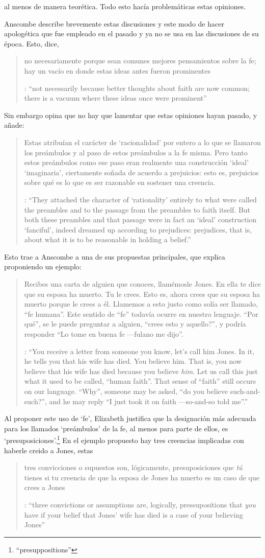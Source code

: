 al menos de manera teorética. Todo esto hacía problemáticas estas opiniones.

Anscombe describe brevemente estas discusiones y este modo de hacer apologética que fue empleado en el pasado y ya no se usa en las discusiones de su época. Esto, dice, \blockquote[{\cite[114]{anscombe1981erp:faith}}: \enquote{not necessarily because better thoughts about faith are now common; there is a vacuum where these ideas once were prominent}]{no necesariamente porque sean comunes mejores pensamientos sobre la fe; hay un vacío en donde estas ideas antes fueron prominentes}. Sin embargo opina que no hay que lamentar que estas opiniones hayan pasado, y añade: \blockquote[{\cite[114]{anscombe1981erp:faith}}: \enquote{They attached the character of `rationality' entirely to what were called the preambles and to the passage from the preambles to faith itself. But both these preambles and that passage were in fact an `ideal' construction \textelp{} `fanciful', indeed dreamed up according to prejudices: prejudices, that is, about what it is to be reasonable in holding a belief.}]{Estas atribuían el carácter de `racionalidad' por entero a lo que se llamaron los preámbulos y al paso de estos preámbulos a la fe misma. Pero tanto estos preámbulos como ese paso eran realmente una construcción `ideal' \textelp{} `imaginaria', ciertamente soñada de acuerdo a prejuicios: esto es, prejuicios sobre qué es lo que es ser razonable en sostener una creencia.}

Esto trae a Anscombe a una de sus propuestas principales, que explica proponiendo un ejemplo: \blockquote[{\cite[114]{anscombe1981erp:faith}}: \enquote{You receive a letter from someone you know, let's call him Jones. In it, he tells you that his wife has died. You believe him. That is, you now believe that his wife has died because you believe \emph{him}. Let us call this just what it used to be called, ``human faith''. That sense of ``faith'' still occurs on our language. ``Why'', someone may be asked, ``do you believe such-and-such?'', and he may reply ``I just took it on faith ---so-and-so told me''.}]{Recibes una carta de alguien que conoces, llamémosle Jones. En ella te dice que su esposa ha muerto. Tu le crees. Esto es, ahora crees que su esposa ha muerto porque le crees a él. Llamemos a esto justo como solía ser llamado, ``fe humana''. Este sentido de ``fe'' todavía ocurre en nuestro lenguaje. ``Por qué'', se le puede preguntar a alguien, ``crees esto y aquello?'', y podría responder ``Lo tome en buena fe ---fulano me dijo''.} Al proponer este uso de `fe', Elizabeth justifica que la designación más adecuada para los llamados `preámbulos' de la fe, al menos para parte de ellos, es `presuposiciones'.\footnote{``presuppositions''} En el ejemplo propuesto hay tres creencias implicadas con haberle creido a Jones, estas \blockquote[{\cite[114]{anscombe1981erp:faith}}: \enquote{three convictions or assumptions are, logically, pressupositions that \emph{you} have if your belief that Jones' wife has died is a case of your believing Jones}]{tres convicciones o supuestos son, lógicamente, presuposiciones que \emph{tú} tienes si tu creencia de que la esposa de Jones ha muerto es un caso de que crees a Jones}.

